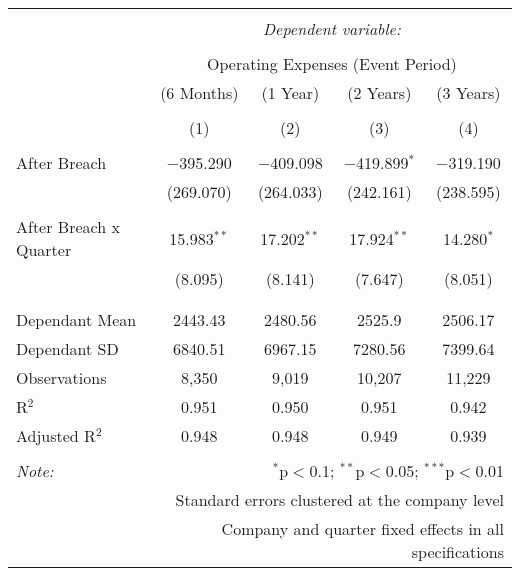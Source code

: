 
\begin{table}[!htbp] \centering 
  \caption{} 
  \label{} 
\begin{tabular}{@{\extracolsep{5pt}}lcccc} 
\\[-1.8ex]\hline 
\hline \\[-1.8ex] 
 & \multicolumn{4}{c}{\textit{Dependent variable:}} \\ 
\cline{2-5} 
\\[-1.8ex] & \multicolumn{4}{c}{Operating Expenses (Event Period)} \\ 
 & (6 Months) & (1 Year) & (2 Years) & (3 Years) \\ 
\\[-1.8ex] & (1) & (2) & (3) & (4)\\ 
\hline \\[-1.8ex] 
 After Breach & $-$395.290 & $-$409.098 & $-$419.899$^{*}$ & $-$319.190 \\ 
  & (269.070) & (264.033) & (242.161) & (238.595) \\ 
  & & & & \\ 
 After Breach x Quarter & 15.983$^{**}$ & 17.202$^{**}$ & 17.924$^{**}$ & 14.280$^{*}$ \\ 
  & (8.095) & (8.141) & (7.647) & (8.051) \\ 
  & & & & \\ 
\hline \\[-1.8ex] 
Dependant Mean & 2443.43 & 2480.56 & 2525.9 & 2506.17 \\ 
Dependant SD & 6840.51 & 6967.15 & 7280.56 & 7399.64 \\ 
Observations & 8,350 & 9,019 & 10,207 & 11,229 \\ 
R$^{2}$ & 0.951 & 0.950 & 0.951 & 0.942 \\ 
Adjusted R$^{2}$ & 0.948 & 0.948 & 0.949 & 0.939 \\ 
\hline 
\hline \\[-1.8ex] 
\textit{Note:}  & \multicolumn{4}{r}{$^{*}$p$<$0.1; $^{**}$p$<$0.05; $^{***}$p$<$0.01} \\ 
 & \multicolumn{4}{r}{Standard errors clustered at the company level} \\ 
 & \multicolumn{4}{r}{Company and quarter fixed effects in all specifications} \\ 
\end{tabular} 
\end{table} 
